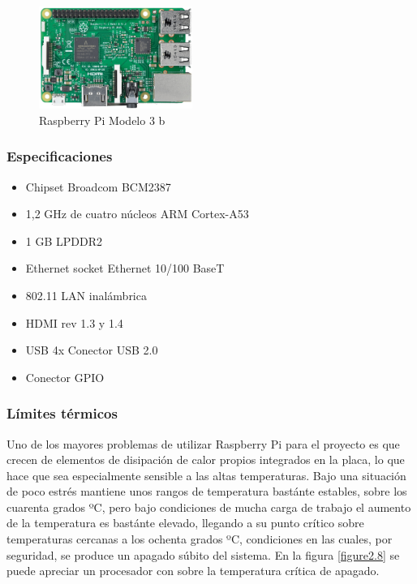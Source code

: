\subsubsection{}

\begin{figure}[H]
	\centering
  	\includegraphics[width=50mm]{pics/rpi3b.jpg}
   	\caption[Raspberry Pi Modelo 3 b]{Raspberry Pi Modelo 3 b}
   \label{figure2.1}
\end{figure}

\subsubsection{}


\subsubsection{Especificaciones}

\begin{itemize}
  \item Chipset Broadcom BCM2387
  \item 1,2 GHz de cuatro núcleos ARM Cortex-A53
  \item 1 GB LPDDR2
  \item Ethernet socket Ethernet 10/100 BaseT
  \item 802.11 LAN inalámbrica
  \item HDMI rev 1.3 y 1.4
  \item USB 4x Conector USB 2.0
  \item Conector GPIO
\end{itemize}

\subsubsection{Límites térmicos}

Uno de los mayores problemas de utilizar Raspberry Pi para el proyecto es que crecen de elementos de disipación de calor propios integrados en la placa, lo que hace que sea especialmente sensible a las altas temperaturas. Bajo una situación de poco estrés mantiene unos rangos de temperatura bastánte estables, sobre los cuarenta grados ºC, pero bajo condiciones de mucha carga de trabajo el aumento de la temperatura es bastánte elevado, llegando a su punto crítico sobre temperaturas cercanas a los ochenta grados ºC, condiciones en las cuales, por seguridad, se produce un apagado súbito del sistema. En la figura \ref{figure2.8} se puede apreciar un procesador con sobre la temperatura crítica de apagado.

